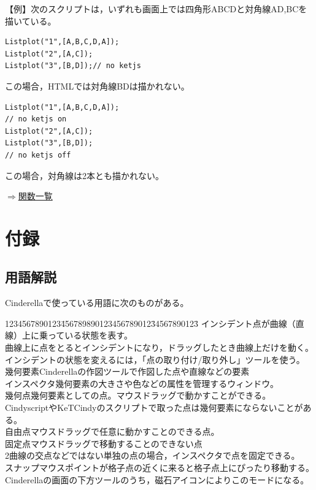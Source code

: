 \documentclass[papersize,a4paper,12pt,uplatex]{jsarticle}
\begin{document}
\begin{description}
【例】次のスクリプトは，いずれも画面上では四角形ABCDと対角線AD,BCを描いている。

\begin{verbatim}
Listplot("1",[A,B,C,D,A]);
Listplot("2",[A,C]);
Listplot("3",[B,D]);// no ketjs
\end{verbatim}

この場合，HTMLでは対角線BDは描かれない。

\begin{verbatim}
Listplot("1",[A,B,C,D,A]);
// no ketjs on
Listplot("2",[A,C]);
Listplot("3",[B,D]);
// no ketjs off
\end{verbatim}

この場合，対角線は2本とも描かれない。

\begin{flushright} \hyperlink{functionlist}{$\Rightarrow$関数一覧}\end{flushright}

\end{description}


\newpage
\section{付録}

\subsection{用語解説} 
Cinderellaで使っている用語に次のものがある。
\begin{tabbing}
1234567890123\=456789890123456789012\=34567890123\=\kill
インシデント\>点が曲線（直線）上に乗っている状態を表す。\\
\>曲線上に点をとるとインシデントになり，ドラッグしたとき曲線上だけを動く。\\
\>インシデントの状態を変えるには，「点の取り付け/取り外し」ツールを使う。\\
幾何要素\>Cinderellaの作図ツールで作図した点や直線などの要素\\
インスペクタ\>幾何要素の大きさや色などの属性を管理するウィンドウ。\\
幾何点\>幾何要素としての点。マウスドラッグで動かすことができる。\\
\>CindyscriptやKeTCindyのスクリプトで取った点は幾何要素にならないことがある。\\
自由点\>マウスドラッグで任意に動かすことのできる点。\\
固定点\>マウスドラッグで移動することのできない点\\
\>2曲線の交点などではない単独の点の場合，インスペクタで点を固定できる。\\ 
スナップ\>マウスポイントが格子点の近くに来ると格子点上にぴったり移動する。\\
\>Cinderellaの画面の下方ツールのうち，磁石アイコンによりこのモードになる。\\
 \end{tabbing}
 
\end{document}
